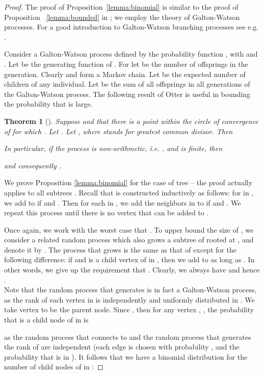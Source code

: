 \documentclass[english, oribibl]{llncs}
\newtheorem{theorem}{Theorem}[section]
\begin{document}
\begin{proof}
The proof of Proposition~\ref{lemma:binomial} is similar to the proof of Proposition ~\ref{lemma:bounded} in \cite{ARV+11};
we employ the theory of Galton-Watson processes.
For a good introduction to Galton-Watson branching processes see e.g. \cite{Har63}.

Consider a Galton-Watson process defined by the probability function
, with  and .
Let 
be the generating function of .
For  let  be the number of offsprings in the  generation.
Clearly  and  form a Markov chain.
Let  be the expected number of children of any individual.
Let  be the sum of all offsprings in all generations of the Galton-Watson process.
The following result of Otter is useful in bounding the probability that  is large.

\begin{theorem}[\cite{Ott49}]\label{thm:Otter}
Suppose  and that there is a point  within the circle of convergence of 
for which . Let .
Let , where  stands for greatest common divisor.
Then


In particular, if the process is \emph{non-arithmetic}, i.e. ,
and  is finite, then

and consequently .
\end{theorem}




We prove Proposition \ref{lemma:binomial} for the case of tree  -- the proof actually applies
to all subtrees .
Recall that  is constructed inductively as follows:
for  in , we add  to  if
 and .
Then for each  in , we add the neighbors  in 
to  if  and .
We repeat this process until there is no vertex that can be added to .


Once again, we work with the worst case that .
To upper bound the size of , we consider a related random process which also
grows a subtree of  rooted at , and denote it by .
The process that grows  is the same as that of 
except for the following difference: if  and  is a child vertex of  in ,
then we add  to  as long as . In other words, we give up the requirement that .
Clearly, we always have  and hence .\\


Note that the random process that generates  is in fact a Galton-Watson process,
as the rank of each vertex in  is independently and uniformly distributed in .
We take vertex  to be the parent node. Since ,
then for any vertex , ,
the probability that  is a child node of  in  is

as the random process that connects  to  and
the random process that generates the rank of  are independent
(each edge is chosen with probability , and the probability that  is in ).
It follows that we have a binomial distribution for the number of child nodes of  in :


\end{proof}
\end{document}
